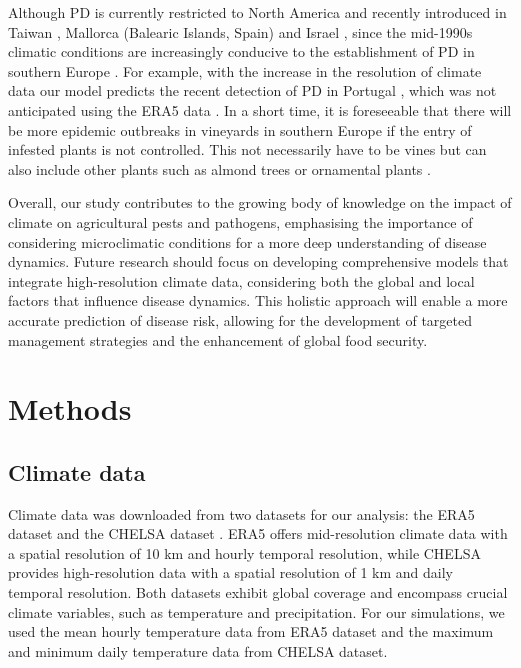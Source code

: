 Although PD is currently restricted to North America and recently
introduced in Taiwan \cite{su2013pierce}, Mallorca (Balearic Islands, Spain)
\cite{gomila2019draft,moralejo2019insights} and Israel
\cite{zecharia2022xylella}, since the mid-1990s climatic conditions are
increasingly conducive to the establishment of PD in southern Europe
\cite{GimenezRomero2022_CommsBio}. For example, with the increase in the
resolution of
climate data our model predicts  the recent detection of PD in Portugal
\cite{loureiro2023xylella}, which was not anticipated using the ERA5 data
\cite{GimenezRomero2022_CommsBio}. In a short time, it is foreseeable that
there will
be more epidemic outbreaks in vineyards in southern Europe if the entry of
infested plants is not controlled. This not necessarily have to be vines but
can also include other plants such as almond trees or ornamental plants
\cite{moralejo2020phylogenetic}.

Overall, our study contributes to the growing body of knowledge on the
impact of climate on agricultural pests and pathogens, emphasising the
importance of considering microclimatic conditions for a more deep
understanding of disease dynamics. Future research should focus on developing
comprehensive models that integrate high-resolution climate data, considering
both the global and local factors that influence disease dynamics. This
holistic approach will enable a more accurate prediction of disease risk,
allowing for the development of targeted management strategies and the
enhancement of global food security.

\section{Methods}

\subsection{Climate data}

Climate data was downloaded from two datasets for our analysis: the ERA5
dataset \cite{munoz-sabater_era5-land_2021, munoz2019era5land} and the CHELSA
dataset \cite{Karger2017, chelsa-climatologies-2021}. ERA5 offers
mid-resolution climate data with a spatial resolution of 10 km and hourly
temporal resolution, while CHELSA provides high-resolution data with a spatial
resolution of 1 km and daily temporal resolution. Both datasets exhibit global
coverage and encompass crucial climate variables, such as temperature and
precipitation. For our simulations, we used the mean hourly temperature data
from ERA5 dataset and the maximum and minimum daily temperature data from
CHELSA dataset.

